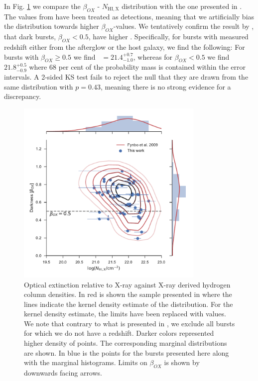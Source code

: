 \documentclass{aa}    %
\begin{document}
In Fig. \ref{fig:betaOX} we compare the $\beta_{OX}$ - $N_{\mathrm{HI, X}}$
distribution with the one presented in \citet{Fynbo2009}. The values from
\citet{Fynbo2009} have been treated as detections, meaning that we artificially
bias the distribution towards higher $\beta_{OX}$-values. We tentatively confirm
the result by \citet{Fynbo2009}, that dark bursts, $\beta_{OX} < 0.5$, have
higher \nhx. Specifically, for bursts with measured redshift either from the
afterglow or the host galaxy, we find the following: For bursts with $\beta_{OX}
\geq 0.5$ we find \nhx~$ = 21.4_{-1.0}^{+0.7}$, whereas for $\beta_{OX} < 0.5$
we find \nhx~$21.8_{-0.9}^{+0.5}$ where 68 per cent of the probability mass is
contained within the error intervals. A 2-sided KS test fails to reject the null
that they are drawn from the same distribution with $p = 0.43$, meaning there is
no strong evidence for a discrepancy.

\begin{figure}
	\centerline{\includegraphics[width=9cm]{figures/betaOX.pdf}} \caption{Optical
	extinction relative to X-ray against X-ray derived hydrogen column densities.
	In red is shown the sample presented in \citet{Fynbo2009} where the lines
	indicate the kernel density estimate of the distribution. For the kernel
	density estimate, the limits have been replaced with values. We note that
	contrary to what is presented in \citet{Fynbo2009}, we exclude all bursts for
	which we do not have a redshift. Darker colors represented higher density of
	points. The corresponding marginal distributions are shown. In blue is the
	points for the bursts presented here along with the marginal histograms. Limits
	on $\beta_{OX}$ is shown by downwards facing arrows.} \label{fig:betaOX}
\end{figure}
\end{document}
